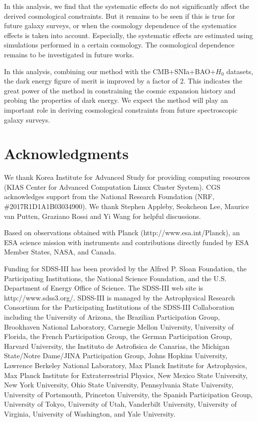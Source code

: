 \documentclass[iop]{emulateapj}
\begin{document}
In this analysis, we find that the systematic effects do not significantly affect the derived cosmological constraints.
But it remains to be seen if this is true for future galaxy surveys,
or when the cosmology dependence of the systematics effects is taken into account.
Especially, the systematic effects are estimated using simulations performed in a certain cosmology.
The cosmological dependence remains to be investigated in future works.


In this analysis, combining our method with the CMB+SNIa+BAO+$H_0$ datasets,
the dark energy figure of merit is improved by a factor of 2.
This indicates the great power of the method in constraining the cosmic expansion history and probing the properties of dark energy.
We expect the method will play an important role in deriving cosmological constraints from future spectroscopic galaxy surveys.



\section*{Acknowledgments}

We thank Korea Institute for Advanced Study for providing computing resources (KIAS Center for Advanced Computation Linux Cluster System).
CGS acknowledges support from the National Research Foundation (NRF,  \#2017R1D1A1B03034900). 
We thank Stephen Appleby, Seokcheon Lee, Maurice van Putten, Graziano Rossi and Yi Wang for helpful discussions.

Based on observations obtained with Planck (http://www.esa.int/Planck), 
an ESA science mission with instruments and contributions directly funded by 
ESA Member States, NASA, and Canada.


Funding for SDSS-III has been provided by the Alfred P. Sloan Foundation, the Participating Institutions, the
National Science Foundation, and the U.S. Department of Energy Office of Science. 
The SDSS-III web site is http://www.sdss3.org/. 
SDSS-III is managed by the Astrophysical Research Consortium for the Participating Institutions
of the SDSS-III Collaboration including the University of Arizona, the Brazilian Participation Group, Brookhaven
National Laboratory, Carnegie Mellon University, University of Florida, the French Participation Group, 
the German Participation Group, Harvard University, the Instituto de Astrofisica de Canarias, the Michigan State/Notre
Dame/JINA Participation Group, Johns Hopkins University, Lawrence Berkeley National Laboratory, Max Planck
Institute for Astrophysics, Max Planck Institute for Extraterrestrial Physics, New Mexico State University, New
York University, Ohio State University, Pennsylvania State
University, University of Portsmouth, Princeton University,
the Spanish Participation Group, University of Tokyo, University of Utah, Vanderbilt University, University of Virginia, 
University of Washington, and Yale University.
\end{document}
